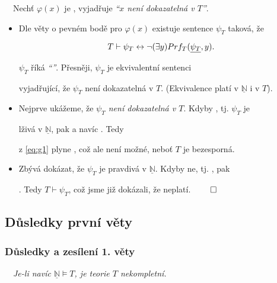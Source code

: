     \smallskip
    
    \ \ Nechť $\varphi(x)$ je , vyjadřuje {\it ``$x$ není dokazatelná v $T$''}.
    
    \begin{itemize}
    \item Dle věty o pevném bodě pro $\varphi(x)$ existuje sentence $\psi_T$ taková, že
    
    \begin{equation}\label{eq:g1}
    {T\vdash \psi_T \leftrightarrow \neg (\exists y)Prf_T(\underline{\psi_T},y)}.
    \end{equation}
    
    
    $\psi_T$ říká {\it ``''}. Přesněji,  $\psi_T$ je ekvivalentní sentenci
    \smallskip
    
    vyjadřující, že $\psi_T$ není dokazatelná v $T$. (Ekvivalence platí v $\underline{\mathbb{N}}$ i v $T$).
    \smallskip
    
    \item Nejprve ukážeme, že {\it $\psi_T$ není dokazatelná v $T$}. Kdyby , tj. $\psi_T$ je
    \smallskip
    
    lživá v $\underline{\mathbb{N}}$, pak  a navíc
    . Tedy
    \smallskip
    
    z \eqref{eq:g1} plyne , což ale není možné, neboť $T$ je bezesporná.
    \smallskip
    
    \item Zbývá dokázat, že $\psi_T$ je pravdivá v $\underline{\mathbb{N}}$. Kdyby ne, tj. , pak
    \smallskip
    
    . Tedy $T \vdash \psi_T$, což jsme již dokázali, že neplatí. $\qed$
    \end{itemize}
    



\subsection{Důsledky první věty}\todo

\subsubsection*{Důsledky a zesílení 1. věty}
    \ \ {\it Je-li navíc $\underline{\mathbb{N}}\models T$, je teorie $T$ nekompletní.}
    \medskip
    
